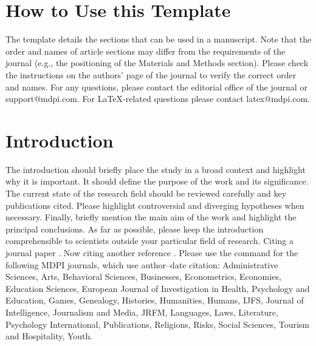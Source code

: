 \documentclass[journal,article,submit,pdftex,moreauthors]{Definitions/mdpi}
\begin{document}
\setcounter{section}{-1} %
\section{How to Use this Template}

The template details the sections that can be used in a manuscript. Note that the order and names of article sections may differ from the requirements of the journal (e.g., the positioning of the Materials and Methods section). Please check the instructions on the authors' page of the journal to verify the correct order and names. For any questions, please contact the editorial office of the journal or support@mdpi.com. For LaTeX-related questions please contact latex@mdpi.com.%


\section{Introduction}

The introduction should briefly place the study in a broad context and highlight why it is important. It should define the purpose of the work and its significance. The current state of the research field should be reviewed carefully and key publications cited. Please highlight controversial and diverging hypotheses when necessary. Finally, briefly mention the main aim of the work and highlight the principal conclusions. As far as possible, please keep the introduction comprehensible to scientists outside your particular field of research. Citing a journal paper \citep{2506.22316}.  Now citing another reference \citep{annoation}. Please use the command \citep{2506.22316,annoation} for the following MDPI journals, which use author--date citation: Administrative Sciences, Arts, Behavioral Sciences, Businesses, Econometrics, Economies, Education Sciences, European Journal of Investigation in Health, Psychology and Education, Games, Genealogy, Histories, Humanities, Humans, IJFS, Journal of Intelligence, Journalism and Media, JRFM, Languages, Laws, Literature, Psychology International, Publications, Religions, Risks, Social Sciences, Tourism and Hospitality, Youth. 
\end{document}
